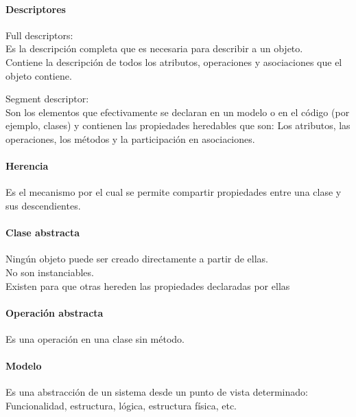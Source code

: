 \documentclass[a4paper,12pt,oneside]{report}
\begin{document}
        \paragraph{Descriptores}
          \begin{description}
            \item Full descriptors:\\
                    Es la descripci\'on completa que es necesaria para describir a un
                    objeto.\\
                    Contiene la descripci\'on de todos los atributos, operaciones y
                    asociaciones que el objeto contiene.
            \item Segment descriptor:\\
                    Son los elementos que efectivamente se declaran en un modelo o
                    en el c\'odigo (por ejemplo, clases) y contienen las propiedades
                    heredables que son: Los atributos, las operaciones, los m\'etodos
                    y la participaci\'on en asociaciones.
          \end{description}

        \paragraph{Herencia}
          Es el mecanismo por el cual se permite compartir propiedades entre
          una clase y sus descendientes.

        \paragraph{Clase abstracta}
          Ning\'un objeto puede ser creado directamente a partir de ellas.\\
          No son instanciables.\\
          Existen para que otras hereden las propiedades declaradas por ellas

        \paragraph{Operaci\'on abstracta}
          Es una operaci\'on en una clase sin m\'etodo.

        \paragraph{Modelo}
          Es una abstracci\'on de un sistema desde un punto de vista determinado:
          Funcionalidad, estructura, l\'ogica, estructura f\'isica, etc.
\end{document}
